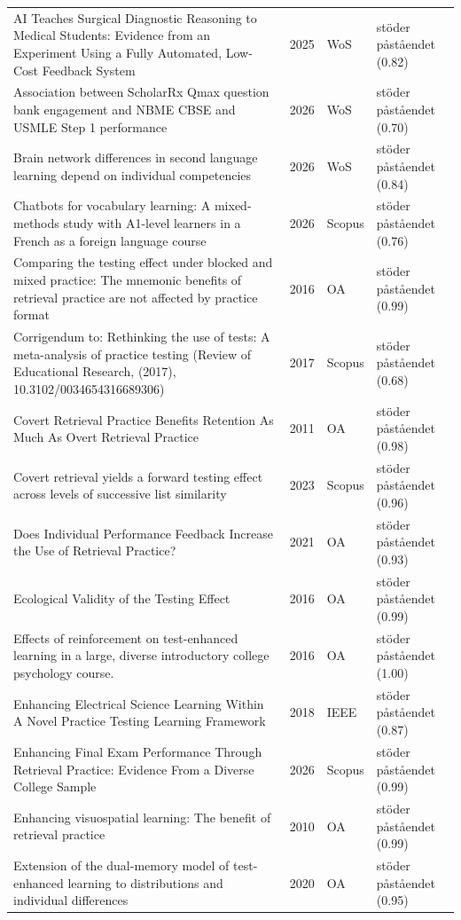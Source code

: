 \begin{longtable}{@{}%
  >{\raggedright\arraybackslash}p{}c%
  >{\raggedright\arraybackslash}p{}%
  >{\raggedright\arraybackslash}p{}@{}}
AI Teaches Surgical Diagnostic Reasoning to Medical Students: Evidence from an Experiment Using a Fully Automated, Low-Cost Feedback System & 2025 & WoS & stöder påståendet (0.82) \\
Association between ScholarRx Qmax question bank engagement and NBME CBSE and USMLE Step 1 performance & 2026 & WoS & stöder påståendet (0.70) \\
Brain network differences in second language learning depend on individual competencies & 2026 & WoS & stöder påståendet (0.84) \\
Chatbots for vocabulary learning: A mixed-methods study with A1-level learners in a French as a foreign language course & 2026 & Scopus & stöder påståendet (0.76) \\
Comparing the testing effect under blocked and mixed practice: The mnemonic benefits of retrieval practice are not affected by practice format & 2016 & OA & stöder påståendet (0.99) \\
Corrigendum to: Rethinking the use of tests: A meta-analysis of practice testing (Review of Educational Research, (2017), 10.3102/0034654316689306) & 2017 & Scopus & stöder påståendet (0.68) \\
Covert Retrieval Practice Benefits Retention As Much As Overt Retrieval Practice & 2011 & OA & stöder påståendet (0.98) \\
Covert retrieval yields a forward testing effect across levels of successive list similarity & 2023 & Scopus & stöder påståendet (0.96) \\
Does Individual Performance Feedback Increase the Use of Retrieval Practice? & 2021 & OA & stöder påståendet (0.93) \\
Ecological Validity of the Testing Effect & 2016 & OA & stöder påståendet (0.99) \\
Effects of reinforcement on test-enhanced learning in a large, diverse introductory college psychology course. & 2016 & OA & stöder påståendet (1.00) \\
Enhancing Electrical Science Learning Within A Novel Practice Testing Learning Framework & 2018 & IEEE & stöder påståendet (0.87) \\
Enhancing Final Exam Performance Through Retrieval Practice: Evidence From a Diverse College Sample & 2026 & Scopus & stöder påståendet (0.99) \\
Enhancing visuospatial learning: The benefit of retrieval practice & 2010 & OA & stöder påståendet (0.99) \\
Extension of the dual-memory model of test-enhanced learning to distributions and individual differences & 2020 & OA & stöder påståendet (0.95) \\

\end{longtable}
